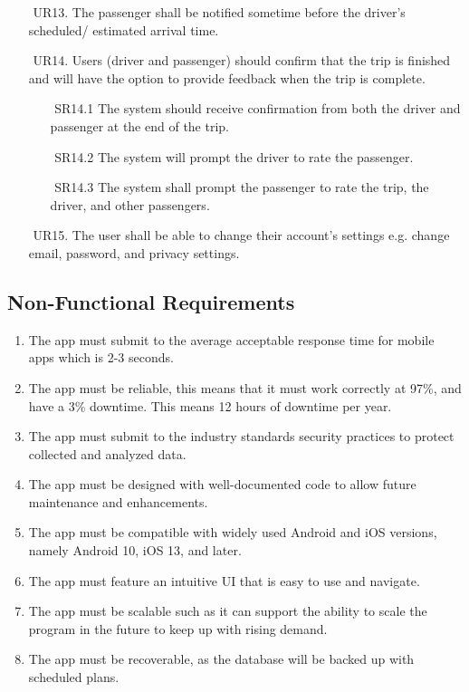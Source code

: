 \documentclass[a4paper, 12pt]{report} %
\begin{document}
\begin{itemize}
                \item [$ $] UR13. The passenger shall be notified sometime before the driver's scheduled/ estimated arrival time.
                \item [$ $] UR14. Users (driver and passenger) should confirm that the trip is finished and will have the option to provide feedback when the trip is complete.
                \begin{itemize}
                    \item [$ $] SR14.1 The system should receive confirmation from both the driver and passenger at the end of the trip. 
                    \item [$ $] SR14.2 The system will prompt the driver to rate the passenger. 
                    \item [$ $] SR14.3 The system shall prompt the passenger to rate the trip, the driver, and other passengers. 
                \end{itemize}
                \item [$ $] UR15. The user shall be able to change their account’s settings e.g. change email, password, and privacy settings.  
           \end{itemize}
        \subsection{Non-Functional Requirements}
        \begin{enumerate}
            \item The app must submit to the average acceptable response time for mobile apps which is 2-3 seconds.
            \item The app must be reliable, this means that it must work correctly at 97\%, and have a 3\% downtime. This means 12 hours of downtime per year.
            \item The app must submit to the industry standards security practices to protect collected and analyzed data.
            \item The app must be designed with well-documented code to allow future maintenance and enhancements.
            \item The app must be compatible with widely used Android and iOS versions, namely Android 10, iOS 13, and later.
            \item The app must feature an intuitive UI that is easy to use and navigate.
            \item The app must be scalable such as it can support the ability to scale the program in the future to keep up with rising demand.
            \item The app must be recoverable, as the database will be backed up with scheduled plans.
        \end{enumerate}
\end{document}
